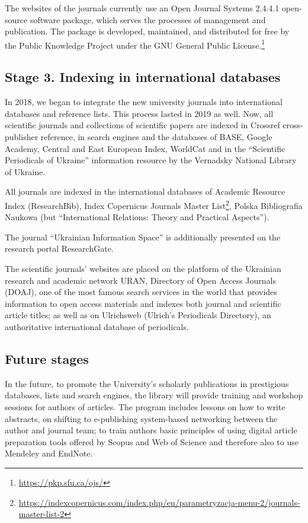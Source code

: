 \documentclass[a4paper,
fontsize=11pt,
oneside,
numbers=noperiodatend,
parskip=half-,
bibliography=totoc,
final
]{scrartcl}
\begin{document}
The websites of the journals currently use an Open Journal Systems
2.4.4.1 open-source software package, which serves the processes of
management and publication. The package is developed, maintained, and
distributed for free by the Public Knowledge Project under the GNU
General Public License.\footnote{\url{https://pkp.sfu.ca/ojs/}}

\hypertarget{stage-3.-indexing-in-international-databases}{%
\subsection{Stage 3. Indexing in international
databases}\label{stage-3.-indexing-in-international-databases}}

In 2018, we began to integrate the new university journals into
international databases and reference lists. This process lasted in 2019
as well. Now, all scientific journals and collections of scientific
papers are indexed in Crossref cross-publisher reference, in search
engines and the databases of BASE, Google Academy, Central and East
European Index, WorldCat and in the \enquote{Scientific Periodicals of
Ukraine} information resource by the Vernadsky National Library of
Ukraine.

All journals are indexed in the international databases of Academic
Resource Index (ResearchBib), Index Copernicus Journals Master
List\footnote{\url{https://indexcopernicus.com/index.php/en/parametryzacja-menu-2/journals-master-list-2}},
Polska Bibliografia Naukowa (but \enquote{International Relations:
Theory and Practical Aspects}).

The journal \enquote{Ukrainian Information Space} is additionally
presented on the research portal ResearchGate.

The scientific journals' websites are placed on the platform of the
Ukrainian research and academic network URAN, Directory of Open Access
Journals (DOAJ), one of the most famous search services in the world
that provides information to open access materials and indexes both
journal and scientific article titles; as well as on Ulrichsweb
(Ulrich's Periodicals Directory), an authoritative international
database of periodicals.

\hypertarget{future-stages}{%
\subsection{Future stages}\label{future-stages}}

In the future, to promote the University's scholarly publications in
prestigious databases, lists and search engines, the library will
provide training and workshop sessions for authors of articles. The
program includes lessons on how to write abstracts, on shifting to
e-publishing system-based networking between the author and journal
team; to train authors basic principles of using digital article
preparation tools offered by Scopus and Web of Science and therefore
also to use Mendeley and EndNote.
\end{document}
